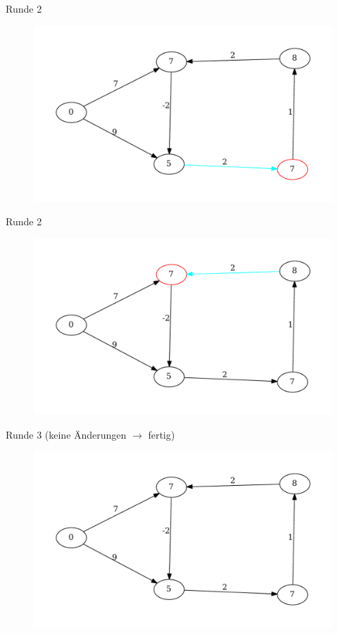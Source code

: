 \begin{frame}{Runde 2}
\begin{figure}[htbp]
\centering
\includegraphics[width=\linewidth]{bellman_ford_graphs/graph_12.pdf}
\end{figure}
\end{frame}

\begin{frame}{Runde 2}
\begin{figure}[htbp]
\centering
\includegraphics[width=\linewidth]{bellman_ford_graphs/graph_13.pdf}
\end{figure}
\end{frame}
\begin{frame}{Runde 3 (keine Änderungen $\rightarrow$ fertig)}

\begin{figure}[htbp]
\centering
\includegraphics[width=\linewidth]{bellman_ford_graphs/graph_14.pdf}
\end{figure}

\end{frame}

